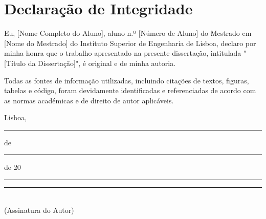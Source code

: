 \chapter*{Declaração de Integridade}

Eu, [Nome Completo do Aluno], aluno n.º [Número de Aluno] do Mestrado em [Nome
do Mestrado] do Instituto Superior de Engenharia de Lisboa, declaro por minha
honra que o trabalho apresentado na presente dissertação, intitulada "[Título da
Dissertação]", é original e de minha autoria.

Todas as fontes de informação utilizadas, incluindo citações de textos, figuras,
tabelas e código, foram devidamente identificadas e referenciadas de acordo com
as normas académicas e de direito de autor aplicáveis.

\vspace{3cm}

\noindent
Lisboa, \rule{3cm}{0.4pt} de \rule{4cm}{0.4pt} de 20\rule{1cm}{0.4pt}

\vspace{2cm}

\noindent
\begin{center}
\rule{8cm}{0.4pt}\\
(Assinatura do Autor)
\end{center}
\newpage
